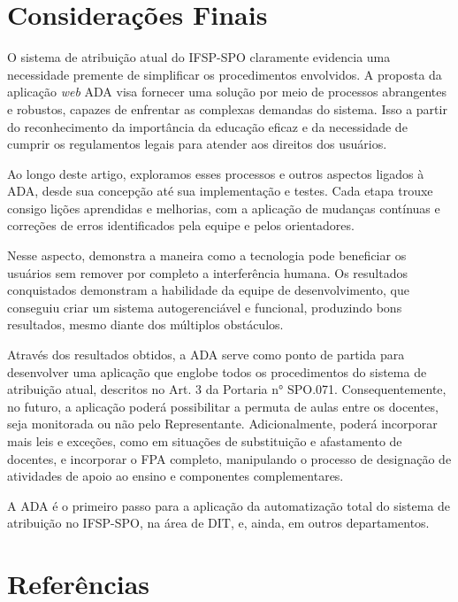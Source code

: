 \documentclass[12pt]{article}
\begin{document}
\section{Considerações Finais}
\par O sistema de atribuição atual do IFSP-SPO claramente evidencia uma necessidade premente de simplificar os procedimentos envolvidos. A proposta da aplicação \textit{web} ADA visa fornecer uma solução por meio de processos abrangentes e robustos, capazes de enfrentar as complexas demandas do sistema. Isso a partir do reconhecimento da importância da educação eficaz e da necessidade de cumprir os regulamentos legais para atender aos direitos dos usuários.
\par Ao longo deste artigo, exploramos esses processos e outros aspectos ligados à ADA, desde sua concepção até sua implementação e testes. Cada etapa trouxe consigo lições aprendidas e melhorias, com a aplicação de mudanças contínuas e correções de erros identificados pela equipe e pelos orientadores.
\par Nesse aspecto, demonstra a maneira como a tecnologia pode beneficiar os usuários sem remover por completo a interferência humana. Os resultados conquistados demonstram a habilidade da equipe de desenvolvimento, que conseguiu criar um sistema autogerenciável e funcional, produzindo bons resultados, mesmo diante dos múltiplos obstáculos.
\par Através dos resultados obtidos, a ADA serve como ponto de partida para desenvolver uma aplicação que englobe todos os procedimentos do sistema de atribuição atual, descritos no Art. 3 da Portaria n° SPO.071. Consequentemente, no futuro, a aplicação poderá possibilitar a permuta de aulas entre os docentes, seja monitorada ou não pelo Representante. Adicionalmente, poderá incorporar mais leis e exceções, como em situações de substituição e afastamento de docentes, e incorporar o FPA completo, manipulando o processo de designação de atividades de apoio ao ensino e componentes complementares.
\par A ADA é o primeiro passo para a aplicação da automatização total do sistema de atribuição no IFSP-SPO, na área de DIT, e, ainda, em outros departamentos.


\section{Referências}
\end{document}
